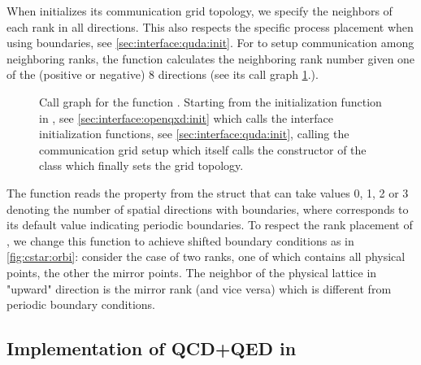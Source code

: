 When \quda initializes its communication grid topology, we specify the neighbors of each rank in all directions. This also respects the specific process placement when using \Cstar boundaries, see \cref{sec:interface:quda:init}. For \quda to setup communication among neighboring ranks, the function  calculates the neighboring rank number given one of the (positive or negative) 8 directions (see its call graph \cref{fig:comm_rank_displaced}.).
\begin{figure}
  
  \caption{Call graph for the function . Starting from the initialization function  in \openqxd, see \cref{sec:interface:openqxd:init} which calls the interface initialization functions, see \cref{sec:interface:quda:init}, calling the communication grid setup which itself calls the constructor of the  class which finally sets the grid topology.}
  \label{fig:comm_rank_displaced}
\end{figure}
The function reads the  property from the  struct that can take values \num{0}, \num{1}, \num{2} or \num{3} denoting the number of spatial directions with \Cstar boundaries, where  corresponds to its default value indicating periodic boundaries.
To respect the rank placement of \openqxd, we change this function to achieve shifted boundary conditions as in \cref{fig:cstar:orbi}: consider the case of two ranks, one of which contains all physical points, the other the mirror points. The neighbor of the physical lattice in "upward" direction is the mirror rank (and vice versa) which is different from periodic boundary conditions.

\subsection{Implementation of QCD+QED in \quda}
\label{sec:interface:qcd+qed}

